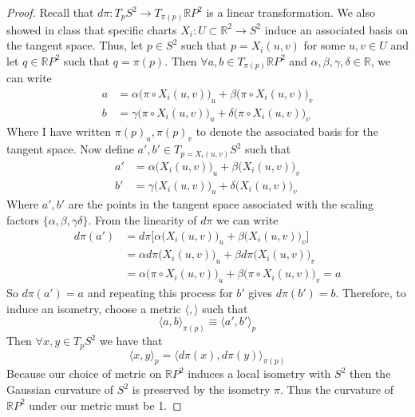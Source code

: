 \documentclass[a4paper, 11pt]{article}
\begin{document}
\begin{proof}
		\noindent Recall that $d\pi:T_p S^2 \to T_{\pi(p)}\mathbb{R}P^2$ is a linear transformation. We also showed in class that specific charts $X_i:U\subset \mathbb{R}^2 \to S^2$ induce an associated basis on the tangent space. Thus, let $p\in S^2$ such that $p= X_i(u,v)$ for some $u,v \in U$ and let $q\in \mathbb{R}P^2$ such that $q=\pi(p)$. Then $\forall a,b \in T_{\pi(p)}\mathbb{R}P^2$ and $\alpha,\beta,\gamma,\delta\in\mathbb{R}$, we can write 
			\begin{align*}
				a &= \alpha\Big(\pi \circ X_i(u,v)\Big)_u + \beta\Big(\pi \circ X_i(u,v)\Big)_v \\ 
				b &= \gamma\Big(\pi \circ X_i(u,v)\Big)_u + \delta\Big(\pi \circ X_i(u,v)\Big)_v 
			\end{align*} 
		\noindent Where I have written $\pi(p)_u, \pi(p)_v$ to denote the associated basis for the tangent space. Now define $a',b'\in T_{p=X_i(u,v)}S^2$ such that 
			\begin{align*}
				a' &= \alpha \Big(X_i(u,v)\Big)_u + \beta \Big(X_i(u,v)\Big)_v \\ 
				b' &= \gamma \Big(X_i(u,v)\Big)_u + \delta \Big(X_i(u,v)\Big)_v 
			\end{align*}
		\noindent Where $a',b'$ are the points in the tangent space associated with the scaling factors $\{\alpha,\beta,\gamma\delta\}$. From the linearity of $d\pi$ we can write
			\begin{align*}
				d\pi(a') &= d\pi \Big[ \alpha \Big(X_i(u,v)\Big)_u + \beta \Big(X_i(u,v)\Big)_v  \Big] \\ 
					&= \alpha d\pi\Big(X_i(u,v)\Big)_u + \beta d\pi\Big(X_i(u,v)\Big)_v \\ 
					&= \alpha\Big(\pi \circ X_i(u,v)\Big)_u + \beta\Big(\pi \circ X_i(u,v)\Big)_v = a 
			\end{align*}
		So $d\pi(a') = a$ and repeating this process for $b'$ gives $d\pi(b') = b$. Therefore, to induce an isometry, choose a metric $\langle , \rangle$ such that 
			\begin{equation*}
				\langle a, b \rangle_{\pi(p)} \equiv \langle a', b' \rangle_p 
			\end{equation*}
		Then $\forall x,y \in T_p S^2$ we have that 
			\begin{equation*}
				\big\langle x, y \big\rangle_p = \big\langle d\pi(x), d\pi(y)\big\rangle_{\pi(p)}  
			\end{equation*}
		Because our choice of metric on $\mathbb{R}P^2$ induces a local isometry with $S^2$ then the Gaussian curvature of $S^2$ is preserved by the isometry $\pi$. Thus the curvature of $\mathbb{R}P^2$ under our metric must be 1. 
	\end{proof}
\end{document}
